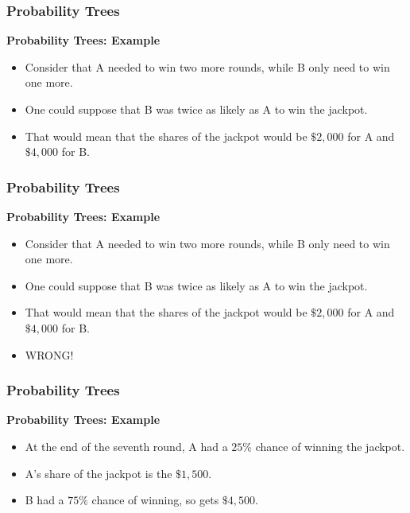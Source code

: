 \documentclass[IntroMain.tex]{subfiles}
\begin{document}
\begin{frame}
\frametitle{Probability Trees}
{  \large 
\textbf{Probability Trees: Example}
\begin{itemize}
\item Consider that A needed to win two more rounds, while B only need to win one more.
\item One could suppose that B was twice as likely as A to win the jackpot.
\item That would mean that the shares of the jackpot would be $\$2,000$ for A and 
$\$4,000$ for B.
\end{itemize}
}
\end{frame}
\begin{frame}
\frametitle{Probability Trees}
{  \large 
\textbf{Probability Trees: Example}
\begin{itemize}
\item Consider that A needed to win two more rounds, while B only need to win one more.
\item One could suppose that B was twice as likely as A to win the jackpot.
\item That would mean that the shares of the jackpot would be $\$2,000$ for A and 
$\$4,000$ for B.
\item \alert{WRONG!}
\end{itemize}
}
\end{frame}
\begin{frame}
\frametitle{Probability Trees}
{  \large 
\textbf{Probability Trees: Example}
\begin{itemize}
\item At the end of the seventh round, A had a $25\%$ chance of winning the jackpot.
\item A's share of the jackpot is  the $\$1,500$.
\item B had a $75\%$ chance of winning, so gets $\$4,500$.
\end{itemize}
}
\end{frame}
\end{document}

